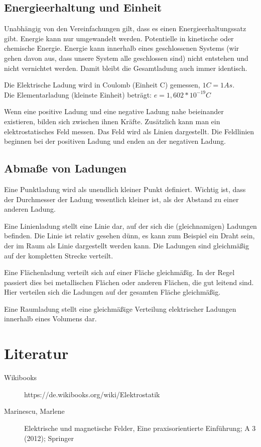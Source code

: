 \documentclass[a4paper,10pt]{scrreprt}
\begin{document}
\section{Energieerhaltung und Einheit}
Unabhängig von den Vereinfachungen gilt, dass es einen Energieerhaltungssatz gibt. Energie kann nur umgewandelt werden. Potentielle in kinetische oder chemische Energie. Energie kann innerhalb eines geschlossenen Systems (wir gehen davon aus, dass unsere System alle geschlossen sind) nicht entstehen und nicht vernichtet werden. Damit bleibt die Gesamtladung auch immer identisch.

Die Elektrische Ladung wird in Coulomb (Einheit C) gemessen, $1 C = 1 As$. \\ Die Elementarladung (kleinste Einheit) beträgt: $e = 1,602 * 10^{-19} C$

Wenn eine positive Ladung und eine negative Ladung nahe beieinander existieren, bilden sich zwischen ihnen Kräfte. Zusätzlich kann man ein elektrostatisches Feld messen. Das Feld wird als Linien dargestellt. Die Feldlinien beginnen bei der positiven Ladung und enden an der negativen Ladung.

\section{Abmaße von Ladungen}
Eine Punktladung wird als unendlich kleiner Punkt definiert. Wichtig ist, dass der Durchmesser der Ladung wesentlich kleiner ist, als der Abstand zu einer anderen Ladung.

Eine Linienladung stellt eine Linie dar, auf der sich die (gleichnamigen) Ladungen befinden. Die Linie ist relativ gesehen dünn, es kann zum Beispiel ein Draht sein, der im Raum als Linie dargestellt werden kann. Die Ladungen sind gleichmäßig auf der kompletten Strecke verteilt.

Eine Flächenladung verteilt sich auf einer Fläche gleichmäßig. In der Regel passiert dies bei metallischen Flächen oder anderen Flächen, die gut leitend sind. Hier verteilen sich die Ladungen auf der gesamten Fläche gleichmäßig.

Eine Raumladung stellt eine gleichmäßige Verteilung elektrischer Ladungen innerhalb eines Volumens dar.



\chapter{Literatur}

\begin{description}
 \item[Wikibooks] https://de.wikibooks.org/wiki/Elektrostatik
 \item[Marinescu, Marlene]  Elektrische und magnetische Felder,
 Eine praxisorientierte Einführung; A 3 (2012); Springer
\end{description}



















\listoffigures
\end{document}

